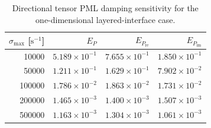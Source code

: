 \begin{table}[htbp]
    \centering
    \caption{Directional tensor PML damping sensitivity for the one-dimensional layered-interface case.}
    \label{tab:pmlSigmaSensitivity}
    \begin{tabular}{rrrr}
        \toprule
        $\sigma_{\max}$ [$\mathrm{s}^{-1}$] & $E_P$ & $E_{P_{\mathrm{re}}}$ & $E_{P_{\mathrm{im}}}$ \\
        \midrule
        10000 & $5.189\times 10^{-1}$ & $7.655\times 10^{-1}$ & $1.850\times 10^{-1}$ \\
        50000 & $1.211\times 10^{-1}$ & $1.629\times 10^{-1}$ & $7.902\times 10^{-2}$ \\
        100000 & $1.786\times 10^{-2}$ & $1.863\times 10^{-2}$ & $1.731\times 10^{-2}$ \\
        200000 & $1.465\times 10^{-3}$ & $1.400\times 10^{-3}$ & $1.507\times 10^{-3}$ \\
        500000 & $1.163\times 10^{-3}$ & $1.304\times 10^{-3}$ & $1.061\times 10^{-3}$ \\
        \bottomrule
    \end{tabular}
\end{table}
